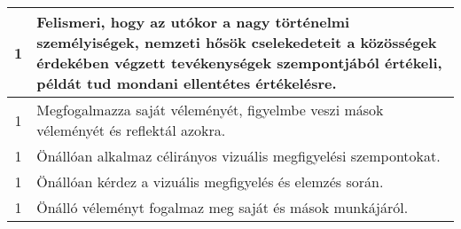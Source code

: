 \begin{longtable}{c | p{12cm} }
                                          1 &  Felismeri, hogy az utókor a nagy történelmi személyiségek, nemzeti hősök cselekedeteit a közösségek érdekében végzett tevékenységek szempontjából értékeli, példát tud mondani ellentétes értékelésre. \\ \hline
                                          1 &  Megfogalmazza saját véleményét, figyelmbe veszi mások véleményét és reflektál azokra. \\ \hline
                                          1 &  Önállóan alkalmaz célirányos vizuális megfigyelési szempontokat. \\ \hline
                                          1 &  Önállóan kérdez a vizuális megfigyelés és elemzés során. \\ \hline
                                          1 &  Önálló véleményt fogalmaz meg saját és mások munkájáról. \\ \hline
                                      

\end{longtable}
